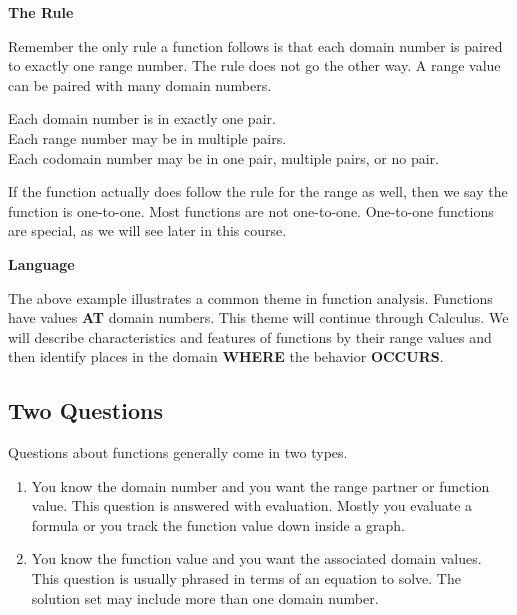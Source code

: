 \documentclass{ximera}
\begin{document}
\begin{remark}  \textbf{\textcolor{yellow!35!black}{The Rule}} 

Remember the only rule a function follows is that each domain number is paired to exactly one range number.  The rule does not go the other way.  A range value can be paired with many domain numbers.

Each domain number is in exactly one pair. \\
Each range number may be in multiple pairs. \\
Each codomain number may be in one pair, multiple pairs, or no pair. 


If the function actually does follow the rule for the range as well, then we say the function is one-to-one. Most functions are not one-to-one.  One-to-one functions are special, as we will see later in this course.


\end{remark}




\begin{remark}  \textbf{\textcolor{yellow!35!black}{Language}} 

The above example illustrates a common theme in function analysis.  Functions have values \textbf{\textcolor{purple!85!blue}{AT}} domain numbers.  This theme will continue through Calculus.  We will describe characteristics and features of functions by their range values and then identify places in the domain \textbf{\textcolor{purple!85!blue}{WHERE}} the behavior \textbf{\textcolor{purple!85!blue}{OCCURS}}. 


\end{remark}





\subsection*{Two Questions}

Questions about functions generally come in two types.
\begin{enumerate}
\item You know the domain number and you want the range partner or function value.  This question is answered with evaluation. Mostly you evaluate a formula or you track the function value down inside a graph.

\item You know the function value and you want the associated domain values.  This question is usually phrased in terms of an equation to solve.  The solution set may include more than one domain number.
\end{enumerate}
\end{document}

